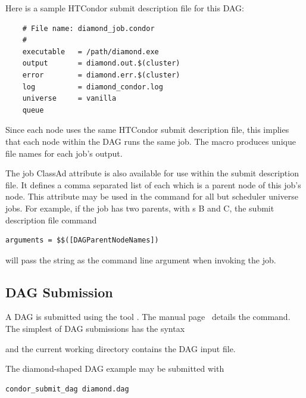 Here is a sample HTCondor submit description file
for this DAG:

\begin{verbatim}
    # File name: diamond_job.condor
    #
    executable   = /path/diamond.exe
    output       = diamond.out.$(cluster)
    error        = diamond.err.$(cluster)
    log          = diamond_condor.log
    universe     = vanilla
    queue
\end{verbatim}

Since each node uses the same HTCondor submit description file,
this implies that each node within the DAG runs the
same job.
The  macro
produces unique file names for each job's output.

The job ClassAd attribute  is also available
for use within the submit description file. 
It defines a comma separated list of each 
which is a parent node of this job's node.
This attribute may be used in the  command
for all but scheduler universe jobs.
For example, if the job has two parents, with s B and C,
the submit description file command
\begin{verbatim}
arguments = $$([DAGParentNodeNames])
\end{verbatim}
will pass the string  as the command line argument when invoking
the job.

\subsection{\label{dagman:submitdag}DAG Submission}

A DAG is submitted using the tool .
The manual
page~\pageref{man-condor-submit-dag}
details the command.
The simplest of DAG submissions has the syntax

 

and the current working directory contains the DAG input file.

The diamond-shaped DAG example may be submitted with

\begin{verbatim}
condor_submit_dag diamond.dag
\end{verbatim}

